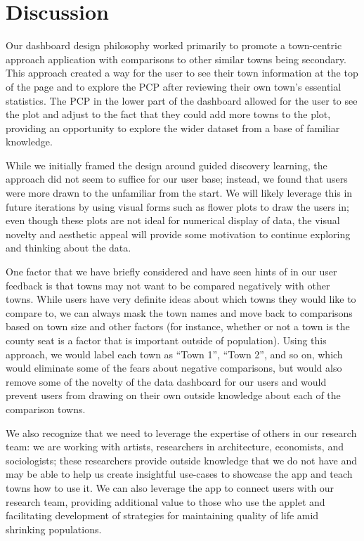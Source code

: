 \documentclass[print]{nuthesis}
\begin{document}
\hypertarget{discussion}{%
\section{Discussion}\label{discussion}}

Our dashboard design philosophy worked primarily to promote a town-centric approach application with comparisons to other similar towns being secondary. This approach created a way for the user to see their town information at the top of the page and to explore the PCP after reviewing their own town's essential statistics. The PCP in the lower part of the dashboard allowed for the user to see the plot and adjust to the fact that they could add more towns to the plot, providing an opportunity to explore the wider dataset from a base of familiar knowledge.

While we initially framed the design around guided discovery learning, the approach did not seem to suffice for our user base; instead, we found that users were more drawn to the unfamiliar from the start. We will likely leverage this in future iterations by using visual forms such as flower plots to draw the users in; even though these plots are not ideal for numerical display of data, the visual novelty and aesthetic appeal will provide some motivation to continue exploring and thinking about the data.

One factor that we have briefly considered and have seen hints of in our user feedback is that towns may not want to be compared negatively with other towns. While users have very definite ideas about which towns they would like to compare to, we can always mask the town names and move back to comparisons based on town size and other factors (for instance, whether or not a town is the county seat is a factor that is important outside of population). Using this approach, we would label each town as ``Town 1'', ``Town 2'', and so on, which would eliminate some of the fears about negative comparisons, but would also remove some of the novelty of the data dashboard for our users and would prevent users from drawing on their own outside knowledge about each of the comparison towns.

We also recognize that we need to leverage the expertise of others in our research team: we are working with artists, researchers in architecture, economists, and sociologists; these researchers provide outside knowledge that we do not have and may be able to help us create insightful use-cases to showcase the app and teach towns how to use it. We can also leverage the app to connect users with our research team, providing additional value to those who use the applet and facilitating development of strategies for maintaining quality of life amid shrinking populations.
\end{document}
